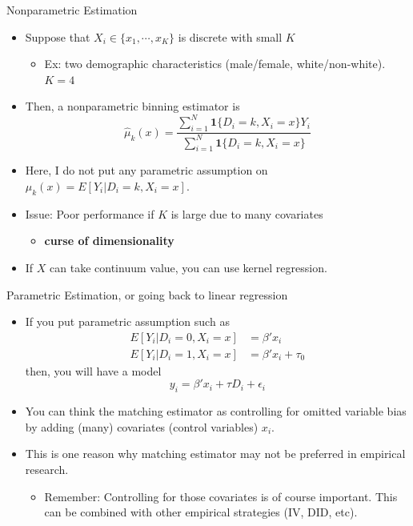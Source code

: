\documentclass[
  ignorenonframetext,
]{beamer}
\providecommand{\tightlist}{%
  \setlength{\itemsep}{0pt}\setlength{\parskip}{0pt}}
\begin{document}
\begin{frame}{Nonparametric Estimation}
\protect\hypertarget{nonparametric-estimation}{}
\begin{itemize}
\item
  Suppose that \(X_{i}\in\{x_{1},\cdots,x_{K}\}\) is discrete with small
  \(K\)

  \begin{itemize}
  \tightlist
  \item
    Ex: two demographic characteristics (male/female, white/non-white).
    \(K=4\)
  \end{itemize}
\item
  Then, a nonparametric binning estimator is
  \[\hat{\mu}_{k}(x)=\frac{\sum_{i=1}^{N}\mathbf{1}\{D_{i}=k,X_{i}=x\}Y_{i}}{\sum_{i=1}^{N}\mathbf{1}\{D_{i}=k,X_{i}=x\}}\]
\item
  Here, I do not put any parametric assumption on
  \(\mu_{k}(x)=E[Y_{i}|D_{i}=k,X_{i}=x]\).
\item
  Issue: Poor performance if \(K\) is large due to many covariates

  \begin{itemize}
  \tightlist
  \item
    \textbf{curse of dimensionality}
  \end{itemize}
\item
  If \(X\) can take continuum value, you can use kernel regression.
\end{itemize}
\end{frame}

\begin{frame}{Parametric Estimation, or going back to linear regression}
\protect\hypertarget{parametric-estimation-or-going-back-to-linear-regression}{}
\begin{itemize}
\item
  If you put parametric assumption such as \[\begin{aligned}
  E[Y_{i}|D_{i}=0,X_{i}=x] & =\beta'x_{i}\\
  E[Y_{i}|D_{i}=1,X_{i}=x] & =\beta'x_{i}+\tau_{0}\end{aligned}\] then,
  you will have a model \[y_{i}=\beta'x_{i}+\tau D_{i}+\epsilon_{i}\]
\item
  You can think the matching estimator as controlling for omitted
  variable bias by adding (many) covariates (control variables)
  \(x_{i}\).
\item
  This is one reason why matching estimator may not be preferred in
  empirical research.

  \begin{itemize}
  \tightlist
  \item
    Remember: Controlling for those covariates is of course important.
    This can be combined with other empirical strategies (IV, DID, etc).
  \end{itemize}
\end{itemize}
\end{frame}
\end{document}
